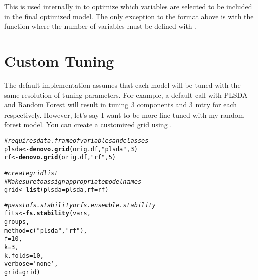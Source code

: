 \documentclass[12pt]{article}\usepackage[]{graphicx}\usepackage[usenames,dvipsnames]{color}
\makeatletter
\newcommand{\hlnum}[1]{\textcolor[rgb]{0.686,0.059,0.569}{#1}}%
\newcommand{\hlstr}[1]{\textcolor[rgb]{0.192,0.494,0.8}{#1}}%
\newcommand{\hlcom}[1]{\textcolor[rgb]{0.678,0.584,0.686}{\textit{#1}}}%
\newcommand{\hlstd}[1]{\textcolor[rgb]{0.345,0.345,0.345}{#1}}%
\newcommand{\hlkwb}[1]{\textcolor[rgb]{0.69,0.353,0.396}{#1}}%
\newcommand{\hlkwc}[1]{\textcolor[rgb]{0.333,0.667,0.333}{#1}}%
\newcommand{\hlkwd}[1]{\textcolor[rgb]{0.737,0.353,0.396}{\textbf{#1}}}%
\newenvironment{kframe}{%
 \def\at@end@of@kframe{}%
 \ifinner\ifhmode%
  \def\at@end@of@kframe{\end{minipage}}%
  \begin{minipage}{\columnwidth}%
 \fi\fi%
 \def\FrameCommand##1{\hskip\@totalleftmargin \hskip-\fboxsep
 \colorbox{shadecolor}{##1}\hskip-\fboxsep
     \hskip-\linewidth \hskip-\@totalleftmargin \hskip\columnwidth}%
 \MakeFramed {\advance\hsize-\width
   \@totalleftmargin\z@ \linewidth\hsize
   \@setminipage}}%
 {\par\unskip\endMakeFramed%
 \at@end@of@kframe}
\newenvironment{knitrout}{}{} %
\makeatother
\begin{document}
This is used internally in  to optimize which
variables are selected to be included in the final optimized model.  The only
exception to the format above is with the  function where the 
number of variables must be defined with .

\newpage
\maketitle
\section{Custom Tuning}

The default implementation assumes that each model will be tuned with the same
resolution of tuning parameters.  For example, a default call with PLSDA and 
Random Forest will result in tuning 3 components and 3 mtry for each
respectively.  However, let's say I want to be more fine tuned with my
random forest model.  You can create a customized grid using 
.

\begin{knitrout}
\color{fgcolor}\begin{kframe}
\begin{alltt}
\hlcom{# requires data.frame of variables and classes}
\hlstd{plsda} \hlkwb{<-} \hlkwd{denovo.grid}\hlstd{(orig.df,} \hlstr{"plsda"}\hlstd{,} \hlnum{3}\hlstd{)}
\hlstd{rf} \hlkwb{<-} \hlkwd{denovo.grid}\hlstd{(orig.df,} \hlstr{"rf"}\hlstd{,} \hlnum{5}\hlstd{)}

\hlcom{# create grid list}
\hlcom{# Make sure to assign appropriate model names}
\hlstd{grid} \hlkwb{<-} \hlkwd{list}\hlstd{(}\hlkwc{plsda}\hlstd{=plsda,} \hlkwc{rf}\hlstd{=rf)}

\hlcom{# pass to fs.stability or fs.ensemble.stability}
\hlstd{fits} \hlkwb{<-} \hlkwd{fs.stability}\hlstd{(vars,}
                    \hlstd{groups,}
                    \hlkwc{method} \hlstd{=} \hlkwd{c}\hlstd{(}\hlstr{"plsda"}\hlstd{,} \hlstr{"rf"}\hlstd{),}
                    \hlkwc{f} \hlstd{=} \hlnum{10}\hlstd{,}
                    \hlkwc{k} \hlstd{=} \hlnum{3}\hlstd{,}
                    \hlkwc{k.folds} \hlstd{=} \hlnum{10}\hlstd{,}
                    \hlkwc{verbose} \hlstd{=} \hlstr{'none'}\hlstd{,}
                    \hlkwc{grid} \hlstd{= grid)}
\end{alltt}
\end{kframe}
\end{knitrout}
\end{document}
